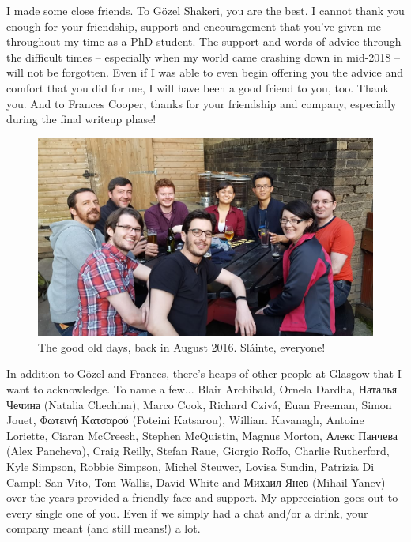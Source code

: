 \begin{preamble}
I made some close friends. To G\"{o}zel Shakeri, you are the best. I cannot thank you enough for your friendship, support and encouragement that you've given me throughout my time as a PhD student. The support and words of advice through the difficult times -- especially when my world came crashing down in mid-2018 -- will not be forgotten. Even if I was able to even begin offering you the advice and comfort that you did for me, I will have been a good friend to you, too. Thank you. And to Frances Cooper, thanks for your friendship and company, especially during the final writeup phase!

\renewcommand{\figurename}{Picture}
\begin{figure}
    \begin{center}
    \vspace*{-9mm}
    \includegraphics[width=1\textwidth]{figures/ch0-brel.jpg}
    \end{center}
    \vspace*{-6mm}
    \caption{The good old days, back in August 2016. Sl\'{a}inte, everyone!}
    \label{fig:acks_friends}
\end{figure}
\renewcommand{\figurename}{Figure}

In addition to G\"{o}zel and Frances, there's heaps of other people at Glasgow that I want to acknowledge. To name a few... Blair Archibald, Ornela Dardha, Наталья Чечина (Natalia Chechina), Marco Cook, Richard Cziv\'{a}, Euan Freeman, Simon Jouet, Φωτεινή Κατσαρού (Foteini Katsarou), William Kavanagh, Antoine Loriette, Ciaran McCreesh, Stephen McQuistin, Magnus Morton, Алекс Панчева (Alex Pancheva), Craig Reilly, Stefan Raue, Giorgio Roffo, Charlie Rutherford, Kyle Simpson, Robbie Simpson, Michel Steuwer, Lovisa Sundin, Patrizia Di Campli San Vito, Tom Wallis, David White and Михаил Янев (Mihail Yanev) over the years provided a friendly face and support. My appreciation goes out to every single one of you. Even if we simply had a chat and/or a drink, your company meant (and still means!) a lot.


\end{preamble}
